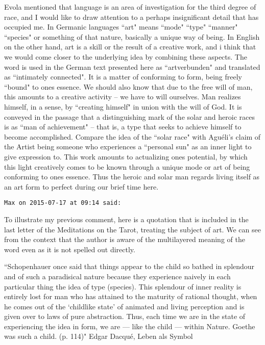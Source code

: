 \begin{footnotesize}
\begin{sffamily}
Evola mentioned that language is an area of investigation for the third degree of race, and I would like to draw attention to a perhaps insignificant detail that has occupied me. In Germanic languages ``art" means ``mode" ``type" ``manner" ``species" or something of that nature, basically a unique way of being. In English on the other hand, art is a skill or the result of a creative work, and i think that we would come closer to the underlying idea by combining these aspects. The word is used in the German text presented here as ``artverbunden" and translated as ``intimately connected". It is a matter of conforming to form, being freely ``bound" to ones essence. We should also know that due to the free will of man, this amounts to a creative activity – we have to will ourselves. Man realizes himself, in a sense, by ``creating himself" in union with the will of God. It is conveyed in the passage that a distinguishing mark of the solar and heroic races is as ``man of achievement" – that is, a type that seeks to achieve himself to become accomplished. Compare the idea of the ``solar race" with Aguéli's claim of the Artist being someone who experiences a ``personal sun" as an inner light to give expression to. This work amounts to actualizing ones potential, by which this light creatively comes to be known through a unique mode or art of being conforming to ones essence. Thus the heroic and solar man regards living itself as an art form to perfect during our brief time here.


\hfill

\texttt{Max on 2015-07-17 at 09:14 said: }

To illustrate my previous comment, here is a quotation that is included in the last letter of the Meditations on the Tarot, treating the subject of art. We can see from the context that the author is aware of the multilayered meaning of the word even as it is not spelled out directly.

``Schopenhauer once said that things appear to the child so bathed in splendour and of such a paradisical nature because they experience naively in each particular thing the idea of type (species). This splendour of inner reality is entirely lost for man who has attained to the maturity of rational thought, when he comes out of the `childlike state' of animated and living perception and is given over to laws of pure abstraction. Thus, each time we are in the state of experiencing the idea in form, we are — like the child — within Nature. Goethe was such a child. (p. 114)" Edgar Dacqué, Leben als Symbol



\end{sffamily}
\end{footnotesize}

